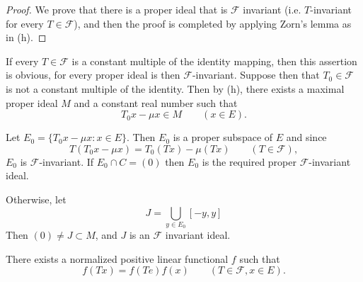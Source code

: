 \begin{proof}
  We prove that there is a proper ideal that is $\mathscr{F}$
  invariant (i.e. $T$-invariant for every $T \in \mathscr{F}$), and
  then the proof is completed by applying Zorn's lemma as in (h). 
\end{proof}

If every $T \in \mathscr{F}$ is a constant multiple of the identity
mapping, then this assertion is obvious, for every proper ideal is
then $\mathscr{F}$-invariant. Suppose then that $T_0 \in \mathscr{F}$
is not a constant multiple of the identity. Then by (h), there
exists a maximal proper ideal $M$ and a constant real number such that  
$$
T_0 x - \mu x \in M \qquad (x \in E).
$$

Let $E_0 = \{ T_0 x - \mu x : x \in E \}$. Then $E_0$ is a proper
subspace of $E$ and since  
$$
T(T_0x- \mu x) = T_0 (Tx) - \mu (Tx) \qquad (T \in \mathscr{F}),
$$
$E_0$ is $\mathscr{F}$-invariant. If $E_0 \cap C = (0)$ then $E_0$ is
the required proper $\mathscr{F}$-invariant ideal. 

Otherwise, let
$$
J = \bigcup\limits_{y \in E_0} [-y, y]
$$
Then $(0) \neq J \subset M$, and $J$ is an $\mathscr{F}$ invariant
ideal.

\begin{coro*}
  There exists a normalized positive linear functional $f$ such that 
  $$
  f(Tx) = f(Te) f(x) \qquad (T \in \mathscr{F}, x \in E).
  $$
\end{coro*}
